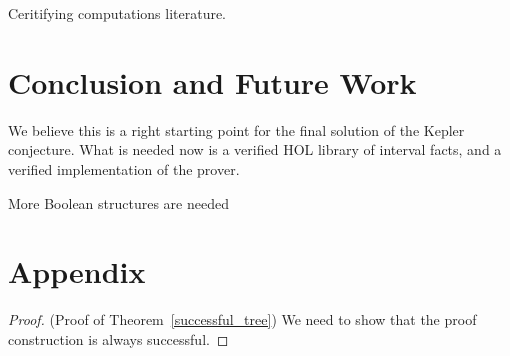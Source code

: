 \documentclass[envcountsect]{llncs}
\begin{document}
Ceritifying computations literature. 


\section{Conclusion and Future Work}

We believe this is a right starting point for the final solution of the Kepler
conjecture. What is needed now is a verified HOL library of interval facts, and
a verified implementation of the prover. 

More Boolean structures are needed 




\newpage
\section*{Appendix}


\begin{proof}(Proof of Theorem~\ref{successful_tree})
We need to show that the proof construction is always successful. 

\end{proof}
\end{document}
